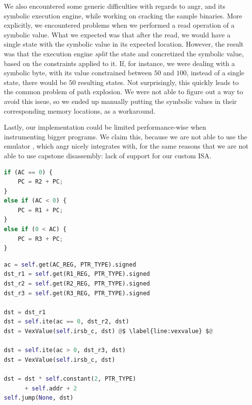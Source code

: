 We also encountered some generic difficulties with regards to angr, and its symbolic execution engine, while working on cracking the sample binaries. More explicitly, we encountered problems when we performed a read operation of a symbolic value. What we expected was that after the read, we would have a single state with the symbolic value in its expected location. However, the result was that the execution engine \emph{split} the state and concretized the symbolic value, based on the constraints applied to it. If, for instance, we were dealing with a symbolic byte, with its value constrained between $50$ and $100$, instead of a single state, there would be $50$ resulting states. Not surprisingly, this quickly leads to the common problem of path explosion. We were not able to figure out a way to avoid this issue, so we ended up manually putting the symbolic values in their corresponding memory locations, as a workaround.

Lastly, our implementation could be limited performance-wise when instrumenting bigger programs. We claim this, because we are not able to use the  emulator \cite{unicorn}, which angr nicely integrates with, for the same reasons that we are not able to use capstone disassembly: lack of support for our custom \gls{ISA}.

\begin{center}

\begin{minipage}[t]{.27\textwidth}
    \begin{lstlisting}[language=python, label={lst:cond_jmp}, caption={\raggedright Cleaned-up decompilation, extracted from Ghidra, of the instruction handler number $111$ from the \cc{vmwhere} embedded \gls{VM}. It performs a conditional jump, based on the value of the \cc{AC} register.}]
if (AC == 0) {
    PC = R2 + PC;
}
else if (AC < 0) {
    PC = R1 + PC;
}
else if (0 < AC) {
    PC = R3 + PC;
}
\end{lstlisting}
\end{minipage}
\hspace{1.3cm}
\begin{minipage}[t]{.60\textwidth}
    \begin{lstlisting}[language=python, label={lst:vex_cond_jmp}, caption={\raggedright Python code which lifts bytecode encoding the conditional jump instruction from Listing \ref{lst:cond_jmp} into VEX IR.}]
ac = self.get(AC_REG, PTR_TYPE).signed
dst_r1 = self.get(R1_REG, PTR_TYPE).signed
dst_r2 = self.get(R2_REG, PTR_TYPE).signed
dst_r3 = self.get(R3_REG, PTR_TYPE).signed

dst = dst_r1
dst = self.ite(ac == 0, dst_r2, dst)
dst = VexValue(self.irsb_c, dst) @$ \label{line:vexvalue} $@

dst = self.ite(ac > 0, dst_r3, dst)
dst = VexValue(self.irsb_c, dst)

dst = dst * self.constant(2, PTR_TYPE) 
      + self.addr + 2
self.jump(None, dst)
\end{lstlisting}
\end{minipage}
\end{center}

